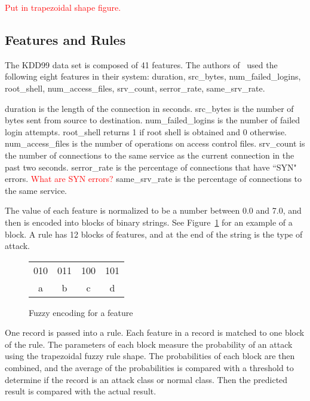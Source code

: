 \documentclass{sig-alternate}
\newcommand{\mycomment}[1]{\textcolor{red}{#1}}
\begin{document}
\mycomment{Put in trapezoidal shape figure.}




\subsection{Features and Rules}
The KDD99 data set is composed of 41 features. The authors of~\cite{6496342, 6559603} used the following eight features in their system: duration, src\_bytes, num\_failed\_logins, root\_shell, num\_access\_files, srv\_count, serror\_rate, same\_srv\_rate.

duration is the length of the connection in seconds. src\_bytes is the number of bytes sent from source to destination. num\_failed\_logins is the number of failed login attempts. root\_shell returns 1 if root shell is obtained and 0 otherwise. num\_access\_files is the number of operations on access control files. srv\_count is the number of connections to the same service as the current connection in the past two seconds. serror\_rate is the percentage of connections that have ``SYN" errors.
\mycomment{What are SYN errors?}
 same\_srv\_rate is the percentage of connections to the same service.~\cite{KDD99Features}


The value of each feature is normalized to be a number between 0.0 and 7.0, and then is encoded into blocks of binary strings. See Figure~\ref{fig:fuzEncodingForFeature} for an example of a block. A rule has 12 blocks of features, and at the end of the string is the type of attack. 

\begin{figure}
\centering
\caption{Fuzzy encoding for a feature}
\begin{tabular}{|c|c|c|c|} \hline
010 & 011 & 100 & 101\\
a & b & c & d\\
\hline\end{tabular}
\label{fig:fuzEncodingForFeature}
\end{figure}

One record is passed into a rule. Each feature in a record is matched to one block of the rule. The parameters of each block measure the probability of an attack using the trapezoidal fuzzy rule shape. The probabilities of each block are then combined, and the average of the probabilities is compared with a threshold to determine if the record is an attack class or normal class. Then the predicted result is compared with the actual result.
\end{document}
